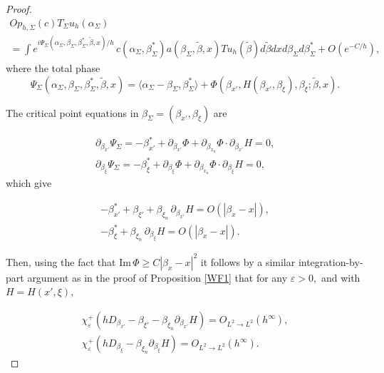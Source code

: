 \documentclass[11pt,reqno]{amsart}
\newcommand{\ep}{\varepsilon}
\renewcommand{\Im} {\mathrm{Im\,}}
\theoremstyle{definition}
\begin{document}
\begin{proof}
\begin{align} \label{wfr7}
Op_{h,\Sigma}(c)  T_{\Sigma} u_h (\alpha_{\Sigma})  \hspace{4in} \nonumber \\
= \int e^{i \Psi_{\Sigma}(\alpha_{\Sigma}, \beta_{\Sigma}, \beta_{\Sigma}^*, \tilde{\beta},x)/h} \, c(\alpha_{\Sigma}, \beta_{\Sigma}^*) a (\beta_{\Sigma}, \tilde{\beta},x) Tu_h(\tilde{\beta})   d\tilde{\beta}  dx d\beta_{\Sigma} d \beta_{\Sigma}^*   + O(e^{-C/h}),
\end{align}
where the total phase
\begin{equation} \label{wfr3'}
\Psi_{\Sigma}(\alpha_{\Sigma}, \beta_{\Sigma},\beta_\Sigma^*,\tilde{\beta},x) = \langle \alpha_{\Sigma} - \beta_{\Sigma}, \beta_{\Sigma}^* \rangle + \Phi( \beta_{x'}, H(\beta_{x'},\beta_\xi), \beta_{\xi}; \tilde{\beta},x).
\end{equation}

The critical point equations in $\beta_{\Sigma} = (\beta_{x'},\beta_\xi)$ are

\begin{eqnarray} \label{wfr8}
\partial_{\beta_{x'}} \Psi_{\Sigma} = - \beta_{x'}^* + \partial_{\beta_{x'}} \Phi + \partial_{\beta_{x_n}} \Phi \cdot \partial_{\beta_{x'}} H = 0, \nonumber \\
\partial_{\beta_{\xi}} \Psi_{\Sigma} = - \beta_{\xi}^* + \partial_{\beta_{\xi}} \Phi  + \partial_{\beta_{x_n}} \Phi \cdot \partial_{\beta_{\xi}} H = 0,
\end{eqnarray}
which give

\begin{eqnarray} \label{crit2}
 - \beta_{x'}^* + \beta_{\xi'}  + \beta_{\xi_n} \, \partial_{\beta_{x'}} H  = O(|\beta_{x} -x|), \nonumber \\
  - \beta_{\xi}^* + \beta_{\xi_n} \, \partial_{\beta_{\xi}} H  = O(|\beta_x -x|). 
\end{eqnarray}

Then, using the fact that $\Im \Phi \geq C |\beta_x -x|^2 $ it follows by a similar integration-by-part argument as in the proof of Proposition \ref{WF1} that for any $\ep >0,$ and with $H = H(x',\xi),$


\begin{eqnarray} \label{wfr9}
\chi_{\ep}^{+}( hD_{\beta_{x'}} - \beta_{\xi'} - \beta_{\xi_n} \partial_{\beta_{x'}}H) = O_{L^2 \to L^2}(h^{\infty}), \nonumber \\
\chi_{\ep}^{+}( hD_{\beta_{\xi} } - \beta_{\xi_n} \partial_{\beta_{\xi}} H) = O_{L^2 \to L^2}(h^{\infty}).
\end{eqnarray}




\end{proof}
\end{document}
